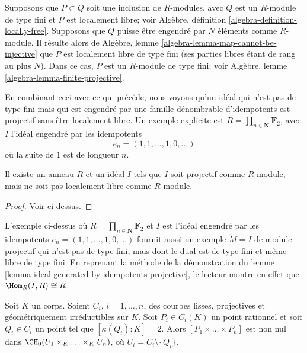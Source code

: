 \noindent
Supposons que $P \subset Q$ soit une inclusion de $R$-modules, avec $Q$
est un $R$-module de type fini et $P$ est localement libre; voir
Algèbre, définition \ref{algebra-definition-locally-free}.
Supposons que $Q$ puisse être engendré par $N$ éléments comme $R$-module.
Il résulte alors de
Algèbre, lemme \ref{algebra-lemma-map-cannot-be-injective}
que $P$ est localement libre de type fini (ses parties libres étant de rang
au plus $N$). Dans ce cas, $P$ est un $R$-module de type fini; voir
Algèbre, lemme \ref{algebra-lemma-finite-projective}.

\medskip\noindent
En combinant ceci avec ce qui précède, nous voyons qu'un idéal qui n'est pas
de type fini mais qui est engendré par une famille dénombrable d'idempotents
est projectif sans être localement libre. Un exemple explicite est
$R = \prod_{n \in \mathbf{N}} \mathbf{F}_2$, avec
$I$ l'idéal engendré par les idempotents
$$
e_n = (1, 1, \ldots, 1, 0, \ldots )
$$
où la suite de $1$ est de longueur $n$.

\begin{lemma}
\label{lemma-ideal-projective-not-locally-free}
Il existe un anneau $R$ et un idéal $I$ tels que $I$ soit projectif comme
$R$-module, mais ne soit pas localement libre comme $R$-module.
\end{lemma}

\begin{proof}
Voir ci-dessus.
\end{proof}

\begin{remark}
\label{remark-projective-with-dual-finite-not-finite}
L'exemple ci-dessus où $R = \prod_{n \in \mathbf{N}} \mathbf{F}_2$ et
$I$ est l'idéal engendré par les idempotents
$e_n = (1, 1, \ldots, 1, 0, \ldots )$ fournit aussi un exemple $M = I$
de module projectif qui n'est pas de type fini, mais dont le dual est de type
fini et même libre de type fini. En reprenant la méthode de la démonstration du
lemme \ref{lemma-ideal-generated-by-idempotents-projective},
le lecteur montre en effet que $\Hom_R(I, R) \cong R$.
\end{remark}

\begin{lemma}
\label{lemma-chow-group-product}
Soit $K$ un corps.
Soient $C_i$, $i = 1, \ldots, n$, des courbes lisses, projectives et géométriquement
irréductibles sur $K$. Soit $P_i \in C_i(K)$ un point rationnel et
soit $Q_i \in C_i$ un point tel que $[\kappa(Q_i) : K] = 2$.
Alors $[P_1 \times \ldots \times P_n]$ est non nul dans
$\CH_0(U_1 \times_K \ldots \times_K U_n)$, où $U_i = C_i \setminus \{Q_i\}$.
\end{lemma}

